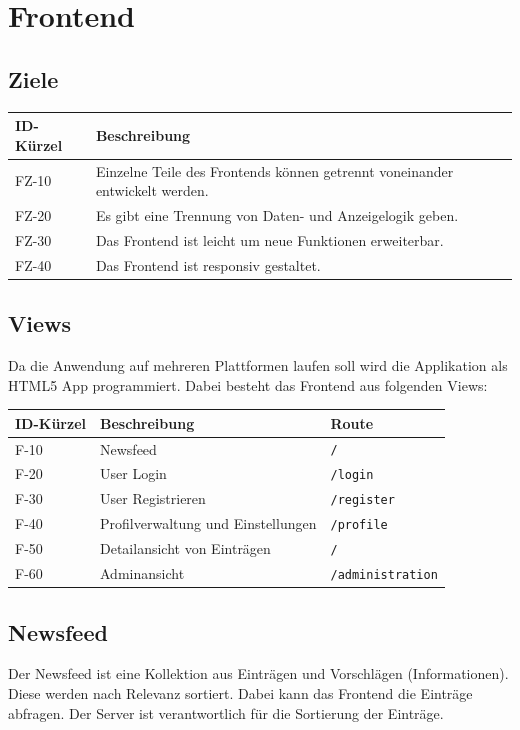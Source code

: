 \chapter{Frontend}

\section{Ziele}
\begin{tabularx}{\textwidth}{|l|X|}
    \toprule
    \textbf{ID-Kürzel} & \textbf{Beschreibung} \\
    \midrule
    \endhead
    \hline
    \caption{Ziele der Frontend-Architektur}
    \endfoot
    FZ-10 & Einzelne Teile des Frontends können getrennt voneinander entwickelt werden.\\
    FZ-20 & Es gibt eine Trennung von Daten- und Anzeigelogik geben.\\
    FZ-30 & Das Frontend ist leicht um neue Funktionen erweiterbar.\\
    FZ-40 & Das Frontend ist responsiv gestaltet.\\
\end{tabularx}

\section{Views}
Da die Anwendung auf mehreren Plattformen laufen soll wird die Applikation als HTML5 App programmiert.
Dabei besteht das Frontend aus folgenden Views:
\begin{tabularx}{\textwidth}{|l|X|l|}
    \toprule
    \textbf{ID-Kürzel} & \textbf{Beschreibung} & \textbf{Route}\\
    \midrule
    \endhead
    \hline
    \caption{Einsatzbereiche}
    \label{Einsatzbereiche:tabelle}
    \endfoot
    F-10 & Newsfeed & \verb+/+\\
    F-20 & User Login & \verb+/login+ \\
    F-30 & User Registrieren & \verb+/register+ \\
    F-40 & Profilverwaltung und Einstellungen & \verb+/profile+\\
    F-50 & Detailansicht von Einträgen & \verb+/+\\
    F-60 & Adminansicht & \verb+/administration+\\
\end{tabularx}

\section{Newsfeed}
Der Newsfeed ist eine Kollektion aus Einträgen und Vorschlägen (Informationen). Diese werden nach Relevanz sortiert.
Dabei kann das Frontend die Einträge abfragen. Der Server ist verantwortlich für die Sortierung der Einträge.

